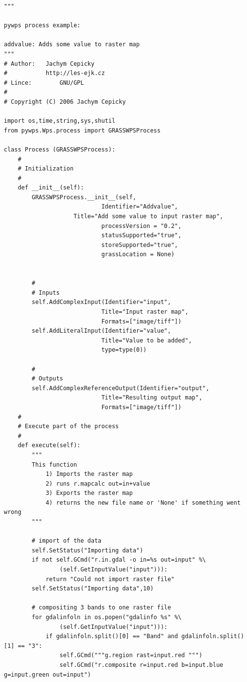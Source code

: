 \documentclass[a4paper,11pt]{article}
\begin{document}
    \begin{verbatim}
"""

pywps process example:

addvalue: Adds some value to raster map
"""
# Author:	Jachym Cepicky
#        	http://les-ejk.cz
# Lince:        GNU/GPL
# 
# Copyright (C) 2006 Jachym Cepicky

import os,time,string,sys,shutil
from pywps.Wps.process import GRASSWPSProcess

class Process (GRASSWPSProcess):
    #
    # Initialization
    #
    def __init__(self):
        GRASSWPSProcess.__init__(self,
                            Identifier="Addvalue",
                    Title="Add some value to input raster map",
                            processVersion = "0.2",
                            statusSupported="true",
                            storeSupported="true",
                            grassLocation = None)


        #
        # Inputs
        self.AddComplexInput(Identifier="input",
                            Title="Input raster map", 
                            Formats=["image/tiff"])
        self.AddLiteralInput(Identifier="value",
                            Title="Value to be added",
                            type=type(0))

        #
        # Outputs
        self.AddComplexReferenceOutput(Identifier="output",
                            Title="Resulting output map",
                            Formats=["image/tiff"])
    #
    # Execute part of the process
    #
    def execute(self):
        """
        This function
            1) Imports the raster map
            2) runs r.mapcalc out=in+value
            3) Exports the raster map
            4) returns the new file name or 'None' if something went wrong
        """

        # import of the data
        self.SetStatus("Importing data")
        if not self.GCmd("r.in.gdal -o in=%s out=input" %\
                (self.GetInputValue("input"))):
            return "Could not import raster file"
        self.SetStatus("Importing data",10)

        # compositing 3 bands to one raster file
        for gdalinfoln in os.popen("gdalinfo %s" %\
                (self.GetInputValue("input"))):
            if gdalinfoln.split()[0] == "Band" and gdalinfoln.split()[1] == "3":
                self.GCmd("""g.region rast=input.red """)
                self.GCmd("r.composite r=input.red b=input.blue g=input.green out=input")


\end{verbatim}
\end{document}
